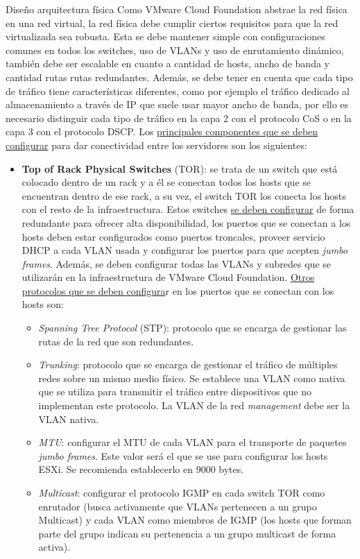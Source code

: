 \begin{subsection}{Diseño arquitectura física}
Como VMware Cloud Foundation abstrae la red física en una red virtual, la red física debe cumplir ciertos requisitos para que la red virtualizada sea robusta. Esta se debe mantener simple con configuraciones comunes en todos los switches, uso de VLANs y uso de enrutamiento dinámico, también debe ser escalable en cuanto a cantidad de hosts, ancho de banda y cantidad rutas rutas redundantes. Además, se debe tener en cuenta que cada tipo de tráfico tiene características diferentes, como por ejemplo el tráfico dedicado al almacenamiento a través de IP que suele usar mayor ancho de banda, por ello es necesario distinguir cada tipo de tráfico en la capa 2 con el protocolo CoS o en la capa 3 con el protocolo DSCP. Los \underline{principales componentes que se deben configurar} para dar conectividad entre los servidores son los siguientes:
\begin{itemize}
    \item \textbf{Top of Rack Physical Switches} (TOR): se trata de un switch que está colocado dentro de un rack y a él se conectan todos los hosts que se encuentran dentro de ese rack, a su vez, el switch TOR los conecta los hosts con el resto de la infraestructura. Estos switches \underline{se deben configurar} de forma redundante para ofrecer alta disponibilidad, los puertos que se conectan a los hosts deben estar configurados como puertos troncales, proveer servicio DHCP a cada VLAN usada y configurar los puertos para que acepten \textit{jumbo frames}. Además, se deben configurar todas las VLANs y subredes que se utilizarán en la infraestructura de VMware Cloud Foundation. \underline{Otros protocolos que se deben configura}r en los puertos que se conectan con los hosts son:
    \begin{itemize}
        \item \emph{Spanning Tree Protocol} (STP): protocolo que se encarga de gestionar las rutas de la red que son redundantes.
        \item \emph{Trunking}: protocolo que se encarga de gestionar el tráfico de múltiples redes sobre un mismo medio físico. Se establece una VLAN como nativa que se utiliza para transmitir el tráfico entre dispositivos que no implementan este protocolo. La VLAN de la red \textit{management} debe ser la VLAN nativa.
        \item \emph{MTU}: configurar el MTU de cada VLAN para el transporte de paquetes \textit{jumbo frames}. Este valor será el que se use para configurar los hosts ESXi. Se recomienda establecerlo en 9000 bytes.
        \item \emph{Multicast}: configurar el protocolo IGMP en cada switch TOR como enrutador (busca activamente que VLANs pertenecen a un grupo Multicast) y cada VLAN como miembros de IGMP (los hosts que forman parte del grupo indican su pertenencia a un grupo multicast de forma activa).
    \end{itemize}
    

\end{itemize}
\end{subsection}
